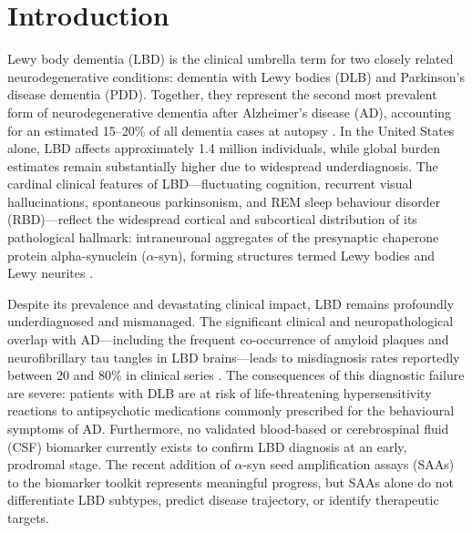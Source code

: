 \section{Introduction}
\label{sec:introduction}

Lewy body dementia (LBD) is the clinical umbrella term for two closely related neurodegenerative conditions: dementia with Lewy bodies (DLB) and Parkinson's disease dementia (PDD). Together, they represent the second most prevalent form of neurodegenerative dementia after Alzheimer's disease (AD), accounting for an estimated 15--20\% of all dementia cases at autopsy \cite{mckeith2017dlb}. In the United States alone, LBD affects approximately 1.4 million individuals, while global burden estimates remain substantially higher due to widespread underdiagnosis. The cardinal clinical features of LBD---fluctuating cognition, recurrent visual hallucinations, spontaneous parkinsonism, and REM sleep behaviour disorder (RBD)---reflect the widespread cortical and subcortical distribution of its pathological hallmark: intraneuronal aggregates of the presynaptic chaperone protein alpha-synuclein ($\alpha$-syn), forming structures termed Lewy bodies and Lewy neurites \cite{spillantini1997alpha}.

Despite its prevalence and devastating clinical impact, LBD remains profoundly underdiagnosed and mismanaged. The significant clinical and neuropathological overlap with AD---including the frequent co-occurrence of amyloid plaques and neurofibrillary tau tangles in LBD brains---leads to misdiagnosis rates reportedly between 20 and 80\% in clinical series \cite{mckeith2017dlb}. The consequences of this diagnostic failure are severe: patients with DLB are at risk of life-threatening hypersensitivity reactions to antipsychotic medications commonly prescribed for the behavioural symptoms of AD. Furthermore, no validated blood-based or cerebrospinal fluid (CSF) biomarker currently exists to confirm LBD diagnosis at an early, prodromal stage. The recent addition of $\alpha$-syn seed amplification assays (SAAs) to the biomarker toolkit represents meaningful progress, but SAAs alone do not differentiate LBD subtypes, predict disease trajectory, or identify therapeutic targets.

